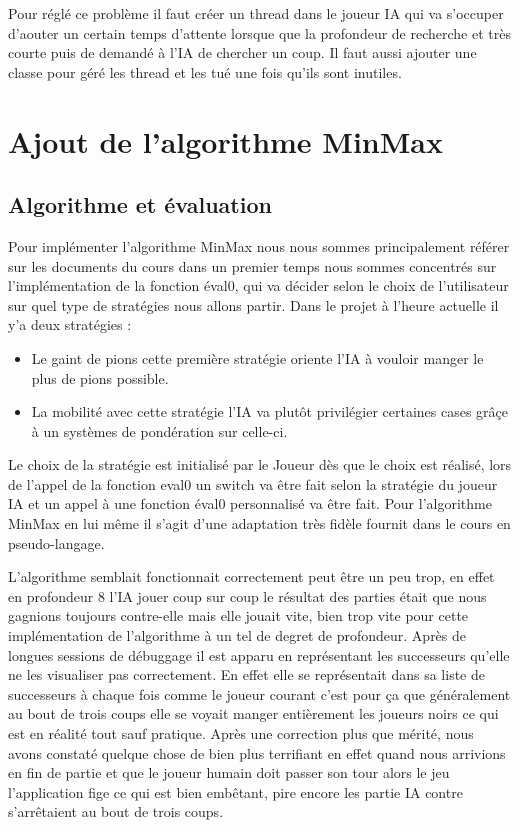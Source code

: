 \documentclass[12pt, legalpaper]{article}
\begin{document}
Pour réglé ce problème il faut créer un thread dans le joueur IA qui va s'occuper
d'aouter un certain temps d'attente lorsque que la profondeur de recherche et très courte
puis de demandé à l'IA de chercher un coup. Il faut aussi ajouter une classe pour 
géré les thread et les tué une fois qu'ils sont inutiles.

\newpage

\section{Ajout de l'algorithme MinMax}
\subsection{Algorithme et évaluation}
Pour implémenter l'algorithme MinMax nous nous sommes principalement référer sur les documents du cours dans un premier temps nous sommes concentrés sur l'implémentation de la fonction éval0, qui va décider selon le choix de l'utilisateur sur quel type de stratégies nous allons partir. Dans le projet à l'heure actuelle il y'a deux stratégies :
\begin{itemize}
    \item Le gaint de pions cette première stratégie oriente l'IA à vouloir manger le plus de pions possible.
    \item La mobilité avec cette stratégie l'IA va plutôt privilégier certaines cases grâçe à un systèmes de pondération sur celle-ci.
\end{itemize}

Le choix de la stratégie est initialisé par le Joueur dès que le choix est réalisé, lors de l'appel de la fonction eval0 un switch va être fait selon la stratégie du joueur IA et un appel à une fonction éval0 personnalisé va être fait.
Pour l'algorithme MinMax en lui même il s'agit d'une adaptation très fidèle fournit dans le cours en pseudo-langage.

L'algorithme semblait fonctionnait correctement peut être un peu trop, en effet en profondeur 8 l'IA jouer coup sur coup le résultat des parties était que nous gagnions toujours contre-elle mais elle jouait vite, bien trop vite pour cette implémentation de l'algorithme à un tel de degret de profondeur. Après de longues sessions de débuggage il est apparu en représentant les successeurs qu'elle ne les visualiser pas correctement. En effet elle se représentait dans sa liste de successeurs à chaque fois comme le joueur courant c'est pour ça que généralement au bout de trois coups elle se voyait manger entièrement les joueurs noirs ce qui est en réalité tout sauf pratique. Après une correction plus que mérité, nous avons constaté quelque chose de bien plus terrifiant en effet quand nous arrivions en fin de partie et que le joueur humain doit passer son tour alors le jeu l'application fige ce qui est bien embêtant, pire encore les partie IA contre s'arrêtaient au bout de trois coups.
\end{document}
